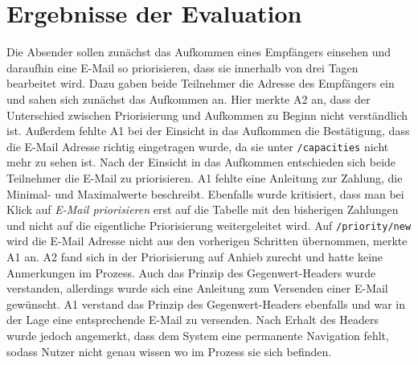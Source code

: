 \section{Ergebnisse der Evaluation}
\label{Ergebnisse der Evaluation}
Die Absender sollen zunächst das Aufkommen eines Empfängers einsehen und daraufhin eine E-Mail so priorisieren, dass sie innerhalb von drei Tagen bearbeitet wird. Dazu gaben beide Teilnehmer die Adresse des Empfängers ein und sahen sich zunächst das Aufkommen an. Hier merkte A2 an, dass der Unterschied zwischen Priorisierung und Aufkommen zu Beginn nicht verständlich ist. Außerdem fehlte A1 bei der Einsicht in das Aufkommen die Bestätigung, dass die E-Mail Adresse richtig eingetragen wurde, da sie unter \texttt{/capacities} nicht mehr zu sehen ist. Nach der Einsicht in das Aufkommen entschieden sich beide Teilnehmer die E-Mail zu priorisieren. A1 fehlte eine Anleitung zur Zahlung, die Minimal- und Maximalwerte beschreibt. Ebenfalls wurde kritisiert, dass man bei Klick auf \textit{E-Mail priorisieren} erst auf die Tabelle mit den bisherigen Zahlungen und nicht auf die eigentliche Priorisierung weitergeleitet wird. Auf \texttt{/priority/new} wird die E-Mail Adresse nicht aus den vorherigen Schritten übernommen, merkte A1 an. A2 fand sich in der Priorisierung auf Anhieb zurecht und hatte keine Anmerkungen im Prozess. Auch das Prinzip des Gegenwert-Headers wurde verstanden, allerdings wurde sich eine Anleitung zum Versenden einer E-Mail gewünscht. A1 verstand das Prinzip des Gegenwert-Headers ebenfalls und war in der Lage eine entsprechende E-Mail zu versenden. Nach Erhalt des Headers wurde jedoch angemerkt, dass dem System eine permanente Navigation fehlt, sodass Nutzer nicht genau wissen wo im Prozess sie sich befinden.

